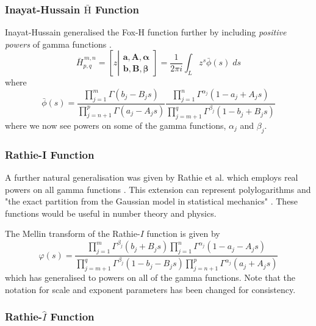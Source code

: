 \documentclass[journal=jcisd8,manuscript=article,layout=onecolumn,pdftex,floatfix,amsmath,amssymb,10pt]{achemso}
\begin{document}
\subsubsection{Inayat-Hussain $\mathrm{\bar{H}}$ Function}
Inayat-Hussain generalised the Fox-H function further by including \emph{positive powers} of gamma functions \cite{Agarwal2012}.
\begin{equation}
\bar{H}_{p,q}^{\,m,n} = \!\left[ z \left| \begin{matrix}
\mathbf{a},\mathbf{A},\mathbf{\alpha} \\
\mathbf{b},\mathbf{B},\mathbf{\beta} \end{matrix} \right. \right]
= \frac{1}{2\pi i}\int_L z^s \bar{\phi}(s)\;ds
\end{equation}
where
\begin{equation}
\bar{\phi}(s) = \frac{\prod_{j=1}^m \Gamma(b_j - B_j s)}{\prod_{j=n+1}^p \Gamma(a_j - A_j s)}   \frac{\prod_{j=1}^n \Gamma^{\alpha_j}(1-a_j + A_j s)}{\prod_{j=m+1}^q \Gamma^{\beta_j}(1- b_j + B_j s)}
\end{equation}
where we now see powers on some of the gamma functions, $\alpha_j$ and $\beta_j$.


\subsubsection{Rathie-I Function}
A further natural generalisation was given by Rathie et al. which employs real powers on all gamma functions \cite{Rathie1997}. This extension can represent polylogarithms and "the exact partition from the Gaussian model in statistical mechanics" \cite{Joycee1972}. These functions would be useful in number theory and physics. 

The Mellin transform of the Rathie-$I$ function is given by \begin{equation}
\varphi(s) = \frac{\prod_{j=1}^m \Gamma^{\beta_j}(b_j+B_j s) \prod_{j=1}^n \Gamma^{\alpha_j}(1-a_j-A_j s)}{\prod_{j=m+1}^q \Gamma^{\beta_j}(1-b_j-B_j s) \prod_{j=n+1}^p \Gamma^{\alpha_j}(a_j + A_j s)}
\end{equation}
which has generalised to powers on all of the gamma functions. Note that the notation for scale and exponent parameters has been changed for consistency.

\subsubsection{Rathie-$\hat{I}$ Function}
\end{document}
